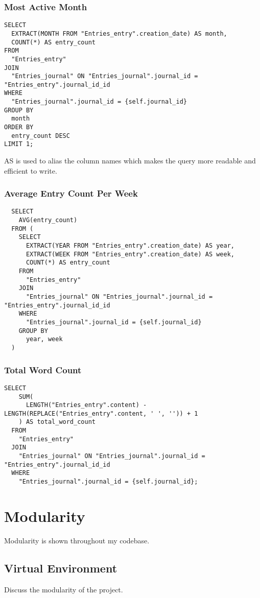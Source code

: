 \subsubsection{Most Active Month}
\begin{verbatim}
SELECT
  EXTRACT(MONTH FROM "Entries_entry".creation_date) AS month,
  COUNT(*) AS entry_count
FROM
  "Entries_entry"
JOIN
  "Entries_journal" ON "Entries_journal".journal_id = "Entries_entry".journal_id_id
WHERE
  "Entries_journal".journal_id = {self.journal_id}
GROUP BY
  month
ORDER BY
  entry_count DESC
LIMIT 1;
\end{verbatim}

AS is used to alias the column names which makes the query more readable and efficient to write.

\subsubsection{Average Entry Count Per Week}
\begin{verbatim}
  SELECT
    AVG(entry_count)
  FROM (
    SELECT
      EXTRACT(YEAR FROM "Entries_entry".creation_date) AS year,
      EXTRACT(WEEK FROM "Entries_entry".creation_date) AS week,
      COUNT(*) AS entry_count
    FROM
      "Entries_entry"
    JOIN
      "Entries_journal" ON "Entries_journal".journal_id = "Entries_entry".journal_id_id
    WHERE
      "Entries_journal".journal_id = {self.journal_id}
    GROUP BY
      year, week
  )
\end{verbatim}

\subsubsection{Total Word Count}
\begin{verbatim}
SELECT
    SUM(
      LENGTH("Entries_entry".content) - LENGTH(REPLACE("Entries_entry".content, ' ', '')) + 1
    ) AS total_word_count
  FROM
    "Entries_entry"
  JOIN
    "Entries_journal" ON "Entries_journal".journal_id = "Entries_entry".journal_id_id
  WHERE
    "Entries_journal".journal_id = {self.journal_id};
\end{verbatim}

\section{Modularity}
Modularity is shown throughout my codebase.

\subsection{Virtual Environment}
Discuss the modularity of the project.


